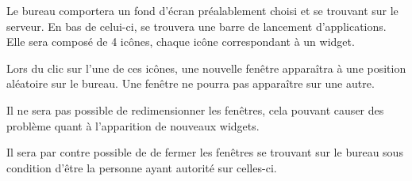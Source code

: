 Le bureau comportera un fond d'écran préalablement choisi et se trouvant sur le serveur. En bas de celui-ci, se trouvera une barre de lancement d'applications. Elle sera composé de 4 icônes, chaque icône correspondant à un widget. 

Lors du clic sur l'une de ces icônes, une nouvelle fenêtre apparaîtra à une position aléatoire sur le bureau. Une fenêtre ne pourra pas apparaître sur une autre. 

Il ne sera pas possible de redimensionner les fenêtres, cela pouvant causer des problème quant à l'apparition de nouveaux widgets. 

Il sera par contre possible de de fermer les fenêtres se trouvant sur le bureau sous condition d'être la personne ayant autorité sur celles-ci.
